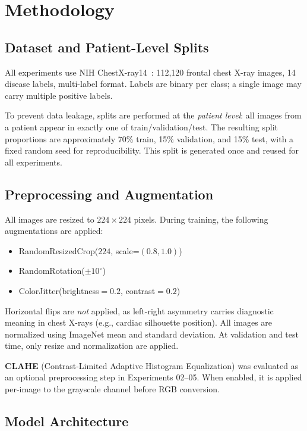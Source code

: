 \section{Methodology}

\subsection{Dataset and Patient-Level Splits}

All experiments use NIH ChestX-ray14~\cite{wang2017chestxray14}: 112,120 frontal chest X-ray images, 14 disease labels, multi-label format.
Labels are binary per class; a single image may carry multiple positive labels.

To prevent data leakage, splits are performed at the \emph{patient level}: all images from a patient appear in exactly one of train/validation/test.
The resulting split proportions are approximately 70\% train, 15\% validation, and 15\% test, with a fixed random seed for reproducibility.
This split is generated once and reused for all experiments.

\subsection{Preprocessing and Augmentation}

All images are resized to $224 \times 224$ pixels.
During training, the following augmentations are applied:
\begin{itemize}
  \item RandomResizedCrop($224$, scale=$(0.8, 1.0)$)
  \item RandomRotation($\pm 10^\circ$)
  \item ColorJitter(brightness$=0.2$, contrast$=0.2$)
\end{itemize}

Horizontal flips are \emph{not} applied, as left-right asymmetry carries diagnostic meaning in chest X-rays (e.g., cardiac silhouette position).
All images are normalized using ImageNet mean and standard deviation.
At validation and test time, only resize and normalization are applied.

\textbf{CLAHE} (Contrast-Limited Adaptive Histogram Equalization) was evaluated as an optional preprocessing step in Experiments 02--05.
When enabled, it is applied per-image to the grayscale channel before RGB conversion.

\subsection{Model Architecture}

